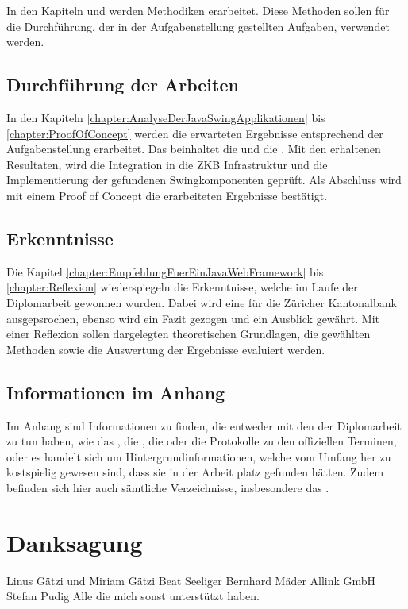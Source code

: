   In den Kapiteln 
  und  werden
  Methodiken erarbeitet. Diese Methoden sollen für die Durchführung, der in der
  Aufgabenstellung gestellten Aufgaben, verwendet werden.
  
  \subsection{Durchführung der Arbeiten}
  
  In den Kapiteln \ref{chapter:AnalyseDerJavaSwingApplikationen} bis
  \ref{chapter:ProofOfConcept} werden die erwarteten Ergebnisse
  entsprechend der Aufgabenstellung erarbeitet. Das beinhaltet die
   und die
  . Mit den erhaltenen
  Resultaten, wird die Integration in die ZKB Infrastruktur und die
  Implementierung der gefundenen Swingkomponenten geprüft. Als Abschluss wird
  mit einem Proof of Concept die erarbeiteten Ergebnisse bestätigt.
  
  \subsection{Erkenntnisse}
  
  Die Kapitel \ref{chapter:EmpfehlungFuerEinJavaWebFramework} bis
  \ref{chapter:Reflexion} wiederspiegeln die Erkenntnisse, welche im Laufe
  der Diplomarbeit gewonnen wurden. Dabei wird eine
   für die Züricher
  Kantonalbank ausgepsrochen, ebenso wird ein Fazit gezogen und ein Ausblick
  gewährt. Mit einer Reflexion sollen dargelegten theoretischen Grundlagen, die
  gewählten Methoden sowie die Auswertung der Ergebnisse evaluiert werden.

  \subsection{Informationen im Anhang}
  
  Im Anhang sind Informationen zu finden, die entweder mit den
   der Diplomarbeit zu tun haben, wie das
  , die , die
   oder die Protokolle zu den offiziellen
  Terminen, oder es handelt sich um Hintergrundinformationen, welche vom Umfang
  her zu kostspielig gewesen sind, dass sie in der Arbeit platz gefunden
  hätten. Zudem befinden sich hier auch sämtliche Verzeichnisse, insbesondere
  das \bibname.
  
  \section{Danksagung}
  
  Linus Gätzi und Miriam Gätzi
  Beat Seeliger
  Bernhard Mäder
  Allink GmbH
  Stefan Pudig
  Alle die mich sonst unterstützt haben.  
  
  